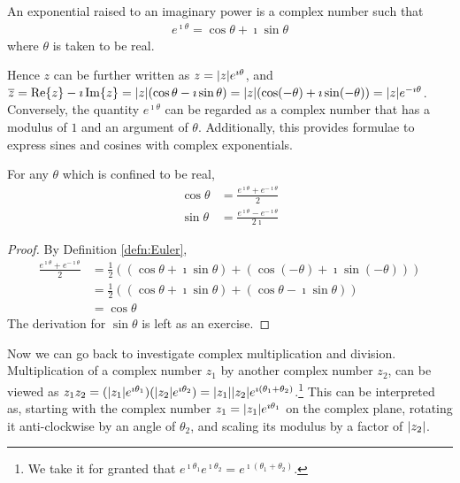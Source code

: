 \begin{defn}
\label{defn:Euler}
An exponential raised to an imaginary power is a complex number such that
\begin{align*}
e^{\imath \theta} = \cos \theta + \imath \sin \theta
\end{align*}
where $\theta$ is taken to be real.
\end{defn}
Hence $z$ can be further written as $z = \abs{z} e^{\imath \theta}$, and $\overline{z} = \Re{z} - \imath\Im{z} = \abs{z} (\cos \theta - \imath \sin \theta) = \abs{z} (\cos (-\theta) + \imath \sin (-\theta)) = \abs{z} e^{-\imath \theta}$. Conversely, the quantity $e^{\imath \theta}$ can be regarded as a complex number that has a modulus of $1$ and an argument of $\theta$. Additionally, this provides formulae to express sines and cosines with complex exponentials.
\begin{proper}
\label{proper:sincoscomplex}
For any $\theta$ which is confined to be real,
\begin{align*}
\cos \theta &= \frac{e^{\imath\theta} + e^{-\imath\theta}}{2} \\
\sin \theta &= \frac{e^{\imath\theta} - e^{-\imath\theta}}{2\imath}
\end{align*}
\end{proper}
\begin{proof}
By Definition \ref{defn:Euler},
\begin{align*}
\frac{e^{\imath\theta} + e^{-\imath\theta}}{2} &= \frac{1}{2}((\cos \theta + \imath \sin \theta) + (\cos (-\theta) + \imath \sin (-\theta))) \\
&= \frac{1}{2}((\cos \theta + \imath \sin \theta) + (\cos \theta - \imath \sin \theta)) \\
&= \cos \theta
\end{align*}  
The derivation for $\sin \theta$ is left as an exercise.
\end{proof}
Now we can go back to investigate complex multiplication and division. Multiplication of a complex number $z_1$ by another complex number $z_2$, can be viewed as $z_1z_2 = (\abs{z_1}e^{\imath \theta_1}) (\abs{z_2} e^{\imath \theta_2}) = \abs{z_1}\abs{z_2}e^{\imath (\theta_1+\theta_2)}$.\footnote{We take it for granted that $e^{\imath \theta_1}e^{\imath \theta_2} = e^{\imath (\theta_1+\theta_2)}$.} This can be interpreted as, starting with the complex number $z_1 = \abs{z_1}e^{\imath \theta_1}$ on the complex plane, rotating it anti-clockwise by an angle of $\theta_2$, and scaling its modulus by a factor of $\abs{z_2}$. \\
